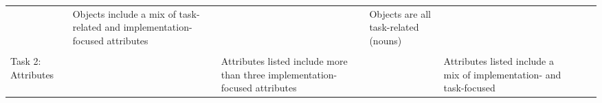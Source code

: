 \documentclass[]{article}
\begin{document}
\begin{longtable}[]{@{}lllllll@{}}
\begin{minipage}[t]{0.03\columnwidth}
\strut
\end{minipage} & \begin{minipage}[t]{0.19\columnwidth}\raggedright
Objects include a mix of task-related and implementation-focused
attributes\strut
\end{minipage} & \begin{minipage}[t]{0.03\columnwidth}\raggedright
\strut
\end{minipage} & \begin{minipage}[t]{0.20\columnwidth}\raggedright
Objects are all task-related (nouns)\strut
\end{minipage}\tabularnewline
\begin{minipage}[t]{0.19\columnwidth}\raggedright
\strut
\end{minipage} & \begin{minipage}[t]{0.03\columnwidth}\raggedright
\strut
\end{minipage} & \begin{minipage}[t]{0.16\columnwidth}\raggedright
\strut
\end{minipage} & \begin{minipage}[t]{0.03\columnwidth}\raggedright
\strut
\end{minipage} & \begin{minipage}[t]{0.19\columnwidth}\raggedright
\strut
\end{minipage} & \begin{minipage}[t]{0.03\columnwidth}\raggedright
\strut
\end{minipage} & \begin{minipage}[t]{0.20\columnwidth}\raggedright
\strut
\end{minipage}\tabularnewline
\begin{minipage}[t]{0.19\columnwidth}\raggedright
Task 2: Attributes\strut
\end{minipage} & \begin{minipage}[t]{0.03\columnwidth}\raggedright
\strut
\end{minipage} & \begin{minipage}[t]{0.16\columnwidth}\raggedright
Attributes listed include more than three implementation-focused
attributes\strut
\end{minipage} & \begin{minipage}[t]{0.03\columnwidth}\raggedright
\strut
\end{minipage} & \begin{minipage}[t]{0.19\columnwidth}\raggedright
Attributes listed include a mix of implementation- and task-focused

\end{minipage}
\end{longtable}
\end{document}
